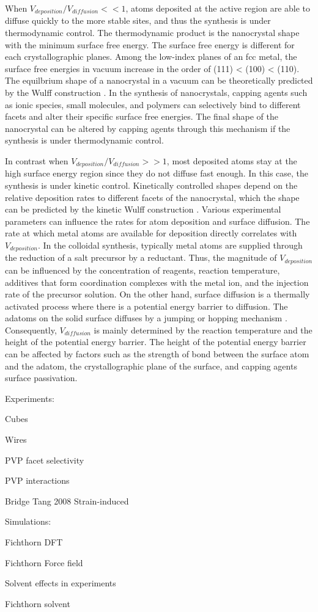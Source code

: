 When $V_{deposition}/V_{diffusion} << 1$, atoms deposited at the active region are able to diffuse quickly to the more stable sites, and thus the synthesis is under thermodynamic control.
The thermodynamic product is the nanocrystal shape with the minimum surface free energy.
The surface free energy is different for each crystallographic planes.
Among the low-index planes of an fcc metal, the surface free energies in vacuum increase in the order of (111) < (100) < (110).
The equilbrium shape of a nanocrystal in a vacuum can be theoretically predicted by the Wulff construction \cite{Bodineau_1999}.
In the synthesis of nanocrystals, capping agents such as ionic species, small molecules, and polymers can selectively bind to different facets and alter their specific surface free energies.
The final shape of the nanocrystal can be altered by capping agents through this mechanism if the synthesis is under thermodynamic control.

In contrast when $V_{deposition}/V_{diffusion} >> 1$, most deposited atoms stay at the high surface energy region since they do not diffuse fast enough.
In this case, the synthesis is under kinetic control.
Kinetically controlled shapes depend on the relative deposition rates to different facets of the nanocrystal, which the shape can be predicted by the kinetic Wulff construction \cite{Zhang_2006}.
Various experimental parameters can influence the rates for atom deposition and surface diffusion.
The rate at which metal atoms are available for deposition directly correlates with $V_{deposition}$.
In the colloidal synthesis, typically metal atoms are supplied through the reduction of a salt precursor by a reductant.
Thus, the magnitude of $V_{deposition}$ can be influenced by the concentration of reagents, reaction temperature, additives that form coordination complexes with the metal ion, and the injection rate of the precursor solution.
On the other hand, surface diffusion is a thermally activated process where there is a potential energy barrier to diffusion.
The adatoms on the solid surface diffuses by a jumping or hopping mechanism \cite{Tringides_1997}.
Consequently, $V_{diffusion}$ is mainly determined by the reaction temperature and the height of the potential energy barrier.
The height of the potential energy barrier can be affected by factors such as the strength of bond between the surface atom and the adatom, the crystallographic plane of the surface, and capping agents surface passivation.

Experiments:

Cubes

Wires

PVP facet selectivity

PVP interactions

Bridge Tang 2008 Strain-induced

Simulations:

Fichthorn DFT

Fichthorn Force field

Solvent effects in experiments

Fichthorn solvent
  